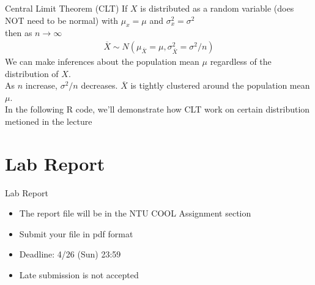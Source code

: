 \documentclass[aspectratio=169]{beamer}
\begin{document}
\begin{frame}{Central Limit Theorem (CLT)}
If $X$ is distributed as a random variable (does NOT need to be normal) with  $\mu_{x} =\mu$ and $\sigma^2_{x} = \sigma^2$\\
then  as $n \rightarrow  \infty$
    {\Large
    \begin{gather*}
        \overline{X} \sim N(\mu_{\bar{X}} = \mu, \sigma^2_{\bar{X}} = \sigma^2 / n)
    \end{gather*}
}
We can make inferences about the population mean $\mu$  regardless of the distribution of $X$.\\
As $n$ increase,  $\sigma^2/n$ decreases. $\overline{X}$ is tightly clustered around the population mean $\mu$.\\
\vspace{8pt}
In the following R code, we'll demonstrate how CLT work on certain distribution metioned in the lecture
\end{frame}


\section{Lab Report}
\begin{frame}{Lab Report}
\begin{itemize}
    \item The report file will be in the NTU COOL Assignment section
    \item Submit your file in pdf format
    \item Deadline: 4/26 (Sun) 23:59
    \item Late submission is not accepted
\end{itemize}
\end{frame}
\end{document}
